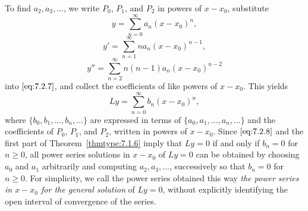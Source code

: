 \documentclass{ximera}
\begin{document}
To find $a_2, a_3, \dots$, we write $P_0$, $P_1$, and $P_2$ in powers of
$x-x_0$, substitute
$$
y=\sum^\infty_{n=0}a_n(x-x_0)^n,
$$
$$
y'=\sum^\infty_{n=1}na_n(x-x_0)^{n-1},
$$
$$
y''=\sum^\infty_{n=2}n(n-1)a_n(x-x_0)^{n-2}
$$
into $\eqref{eq:7.2.7}$, and collect the coefficients of like powers of
$x-x_0$. This yields
\begin{equation}\label{eq:7.2.8}
Ly=\sum^\infty_{n=0}b_n(x-x_0)^n,
\end{equation}
where $\{b_0, b_1, \dots, b_n, \dots\}$ are expressed in terms of
$\{a_0, a_1, \dots,a_n, \dots\}$ and the coefficients of $P_0$, $P_1$,
and $P_2$, written in powers of $x-x_0$. Since $\eqref{eq:7.2.8}$ and
the first part %
of Theorem~\ref{thmtype:7.1.6} imply that $Ly=0$ if and only if
$b_n=0$ for $n\geq0$,  all power series solutions in
$x-x_0$ of $Ly=0$ can be obtained by choosing $a_0$ and $a_1$
arbitrarily and computing $a_2, a_3, \dots$, successively so that
$b_n=0$
for $n\geq0$. For simplicity, we call the power series obtained  this
way \textit{the power series in $x-x_0$ for the general solution} of
$Ly=0$, without explicitly identifying the open interval of
convergence of the series.
\end{document}
